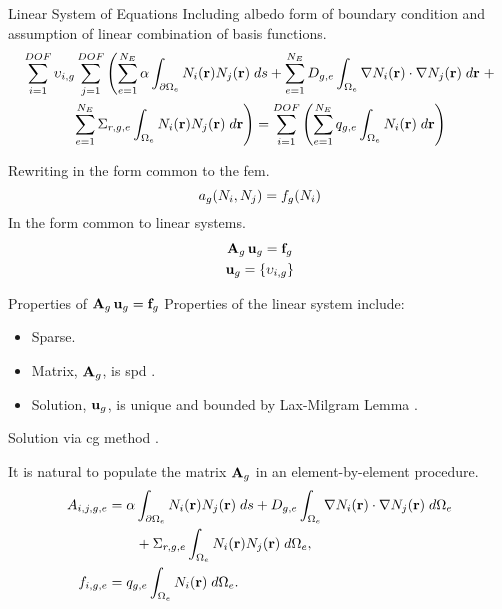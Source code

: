 \begin{frame}{Linear System of Equations}
  Including albedo form of boundary condition and assumption of 
  linear combination of basis functions.
  \begin{multline}
    \label{eq:linear_equation}
    \sum_{i=1}^{DOF} \upsilon_{i,g} \sum_{j=1}^{DOF} \left(
      \sum_{e=1}^{N_E} \alpha \int_{\partial \Omega_e}
      N_i(\mathbf{r})  N_j(\mathbf{r}) \;ds +
      \sum_{e=1}^{N_E} D_{g,e} 
      \int_{\Omega_e} \mathbf{\nabla} N_i(\mathbf{r}) \cdot \mathbf{\nabla} N_j(\mathbf{r})\;d\mathbf{r}
      \right.
      + \\
      \left.
      \sum_{e=1}^{N_E} \Sigma_{r,g,e}
      \int_{\Omega_e} N_i(\mathbf{r}) N_j(\mathbf{r}) \; d\mathbf{r} \right) =
      \sum_{i=1}^{DOF} \left(
      \sum_{e=1}^{N_E} q_{g,e} 
      \int_{\Omega_e} N_i(\mathbf{r}) \; d\mathbf{r} \right)
  \end{multline}

  Rewriting in the form common to the \gls{fem}.
  \begin{equation}
    \label{eq:fem_notation}
    a_g(N_i,N_j) = f_g(N_i)
  \end{equation}
  In the form common to linear systems.
  \begin{gather}
    \label{eq:matrix_notation}
    \mathbf{A}_g \, \mathbf{u}_g = \mathbf{f}_g \\
    \mathbf{u}_g = \{\upsilon_{i,g}\}
  \end{gather}
\end{frame}

\begin{frame}{Properties of $\mathbf{A}_g \, \mathbf{u}_g = \mathbf{f}_g$}
  Properties of the linear system include:
  \begin{itemize}
    \item Sparse.
    \item Matrix, $\mathbf{A}_g$, is \gls{spd} \cite{textbookhughes}.
    \item Solution, $\mathbf{u}_g$, is unique and bounded by Lax-Milgram Lemma 
      \cite{textbookli}.
  \end{itemize}
  Solution via \gls{cg} method 
  \cite{Kelley1995IterativeEquations}.

  It is natural to populate the matrix $\mathbf{A}_g$ in an element-by-element 
  procedure.
  \begin{align}
    \label{eq:matrix_population}
    A_{i,j,g,e} &= \alpha \int_{\partial \Omega_e} N_i(\mathbf{r}) 
      N_j(\mathbf{r}) \; ds + D_{g,e} 
      \int_{\Omega_e} \mathbf{\nabla} N_i(\mathbf{r}) \cdot \mathbf{\nabla} N_j(\mathbf{r}) \;
      d\Omega_e \\
    &\qquad + \Sigma_{r,g,e} \int_{\Omega_e} N_i(\mathbf{r}) N_j(\mathbf{r})
      \; d\Omega_e, \\
    \label{eq:vector_population}
    f_{i,g,e} &= q_{g,e} \int_{\Omega_e} N_i(\mathbf{r}) \;d\Omega_e.
  \end{align}
\end{frame}

